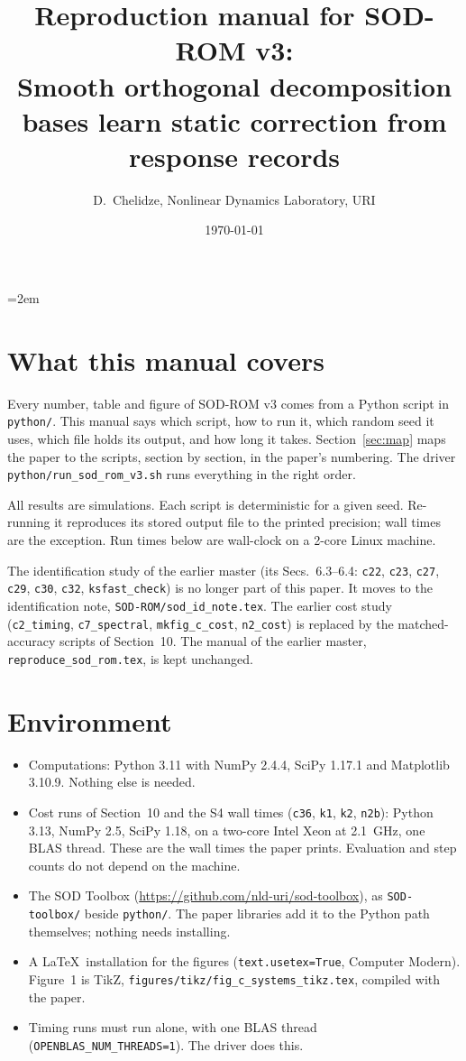 \documentclass[10pt]{article}
\title{Reproduction manual for SOD-ROM v3:\\ \large Smooth orthogonal decomposition bases learn static correction from response records}
\author{D.~Chelidze, Nonlinear Dynamics Laboratory, URI}
\date{\today}
\newcommand{\f}[1]{\texttt{#1}}
\begin{document}
\emergencystretch=2em
\maketitle

\section{What this manual covers}
Every number, table and figure of SOD-ROM v3 comes from a Python script in \f{python/\allowbreak{}}.
This manual says which script, how to run it, which random seed it uses, which file holds its output, and how long it takes.
Section~\ref{sec:map} maps the paper to the scripts, section by section, in the paper's numbering.
The driver \f{python/\allowbreak{}run\_\allowbreak{}sod\_\allowbreak{}rom\_\allowbreak{}v3.sh} runs everything in the right order.

All results are simulations. Each script is deterministic for a given seed. Re-running it reproduces its stored output file to the printed precision; wall times are the exception.
Run times below are wall-clock on a 2-core Linux machine.

The identification study of the earlier master (its Secs.~6.3--6.4: \f{c22}, \f{c23}, \f{c27}, \f{c29}, \f{c30}, \f{c32}, \f{ksfast\_\allowbreak{}check}) is no longer part of this paper. It moves to the identification note, \f{SOD-ROM/\allowbreak{}sod\_\allowbreak{}id\_\allowbreak{}note.tex}. The earlier cost study (\f{c2\_\allowbreak{}timing}, \f{c7\_\allowbreak{}spectral}, \f{mkfig\_\allowbreak{}c\_\allowbreak{}cost}, \f{n2\_\allowbreak{}cost}) is replaced by the matched-accuracy scripts of Section~10. The manual of the earlier master, \f{reproduce\_\allowbreak{}sod\_\allowbreak{}rom.tex}, is kept unchanged.

\section{Environment}
\begin{itemize}
\item Computations: Python 3.11 with NumPy 2.4.4, SciPy 1.17.1 and Matplotlib 3.10.9. Nothing else is needed.
\item Cost runs of Section~10 and the S4 wall times (\f{c36}, \f{k1}, \f{k2}, \f{n2b}): Python 3.13, NumPy 2.5, SciPy 1.18, on a two-core Intel Xeon at 2.1~GHz, one BLAS thread. These are the wall times the paper prints. Evaluation and step counts do not depend on the machine.
\item The SOD Toolbox (\url{https://github.com/nld-uri/sod-toolbox}), as \f{SOD-toolbox/\allowbreak{}} beside \f{python/\allowbreak{}}. The paper libraries add it to the Python path themselves; nothing needs installing.
\item A \LaTeX\ installation for the figures (\f{text.usetex=True}, Computer Modern). Figure~1 is TikZ, \f{figures/\allowbreak{}tikz/\allowbreak{}fig\_\allowbreak{}c\_\allowbreak{}systems\_\allowbreak{}tikz.tex}, compiled with the paper.
\item Timing runs must run alone, with one BLAS thread (\f{OPENBLAS\_\allowbreak{}NUM\_\allowbreak{}THREADS=1}). The driver does this.
\end{itemize}
\end{document}
